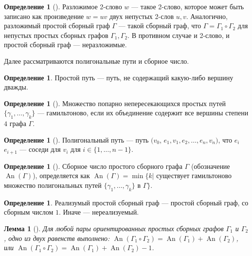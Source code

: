 \documentclass[a4paper,fleqn,12pt,top=0pt]{article}
\theoremstyle{plain}
\newtheorem{lemma}[theorem]{Лемма}
\theoremstyle{definition}
\newtheorem{definition}[theorem]{Определение}
\theoremstyle{remark}
\newcommand{\An}{\operatorname{An}}
\begin{document}
\begin{definition}[]
    Разложимое 2-слово $w$ --- такое 2-слово, которое может быть записано как произведение $w = uv$ двух непустых 2-слов $u, v$. Аналогично, разложимый простой сборный граф $\Gamma$ --- такой сборный граф, что $\Gamma = \Gamma_1 \circ \Gamma_2$ для непустых простых сборных графов $\Gamma_1, \Gamma_2$. В противном случае и 2-слово, и простой сборный граф --- неразложимые.
\end{definition}

Далее рассматриваются полигональные пути и сборное число.

\begin{definition}
    Простой путь --- путь, не содержащий какую-либо вершину дважды.
\end{definition}

\begin{definition}[]
    Множество попарно непересекающихся простых путей $\{\gamma_1, \dots, \gamma_k\}$ --- гамильтоново, если их объединение содержит все вершины степени $4$ графа $\Gamma$.
\end{definition}

\begin{definition}[]
    Полигональный путь --- путь $(v_0$, $e_1, v_1, e_2 ,\dots, e_n, v_n)$, что $e_i$  $e_{i + 1}$ --- соседи для $v_i$ для $i \in \{1, \dots, n-1\}$.
\end{definition}

\begin{definition}[]
    Сборное число простого сборного графа $\Gamma$ (обозначение $\An(\Gamma)$), определяется как $\An(\Gamma) = \min\{k | $ существует гамильтоново множество полигональных путей $\{\gamma_1, \dots, \gamma_k\}$ в $\Gamma\}$.
\end{definition}

\begin{definition}
    Реализумый простой сборный граф --- простой сборный граф, со сборным числом $1$. Иначе --- нереализуемый.
\end{definition}

\begin{lemma}[]
    Для любой пары ориентированных простых сборных графов $\Gamma_1$ и $\Gamma_2$, одно из двух равенств выполнено: $\An(\Gamma_1 \circ \Gamma_2) = \An(\Gamma_1) + \An(\Gamma_2)$, или $\An(\Gamma_1 \circ \Gamma_2) = \An(\Gamma_1) + \An(\Gamma_2) - 1$.
\end{lemma}
\end{document}
